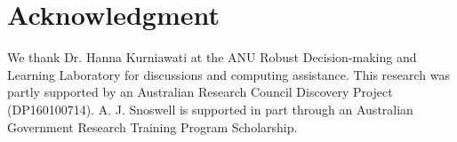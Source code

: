 \documentclass[letterpaper, 10 pt, conference]{ieeeconf}
\begin{document}

\section*{Acknowledgment}

We thank Dr. Hanna Kurniawati at the ANU Robust Decision-making and Learning Laboratory for discussions and computing assistance.
This research was partly supported by an Australian Research Council Discovery Project (DP160100714).
A. J. Snoswell is supported in part through an Australian Government Research Training Program Scholarship. 




\end{document}
